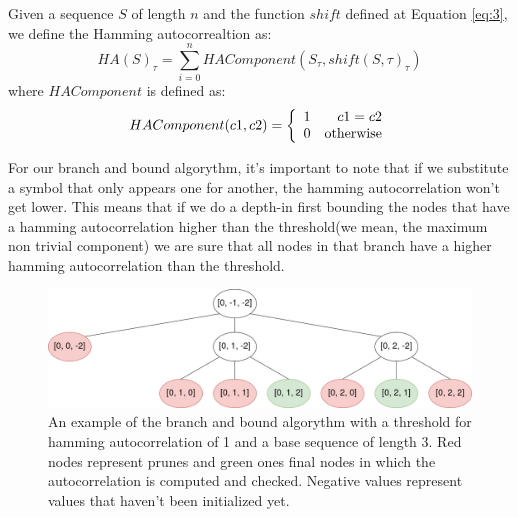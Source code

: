   \begin{definition}
    Given a sequence $S$ of length $n$ and the function $shift$ defined at
    Equation \ref{eq:3}, we define the Hamming autocorrealtion as:
      \begin{equation}
        HA(S)_{\tau} = \sum_{i=0}^{n} HAComponent(S_{\tau}, shift(S, \tau)_{\tau})
      \end{equation}
    where $HAComponent$ is defined as:
      \begin{equation}
        HAComponent(c1, c2) = \left\{\begin{array}{lr}
            1  &  c1 = c2\\
            0  & \textnormal{otherwise} \\
        \end{array}\right.
      \end{equation}
  \end{definition}

  For our branch and bound algorythm, it's important to note that if we
  substitute a symbol that only appears one for another, the hamming
  autocorrelation won't get lower. This means that if we do a depth-in first
  bounding the nodes that have a hamming autocorrelation higher than the
  threshold(we mean, the maximum non trivial component) we are sure that all
  nodes in that branch have a higher hamming autocorrelation than the
  threshold.\\

  \begin{figure}[ht!]
    \begin{center}
      \includegraphics[scale=0.4]{Chapters/Implementation/Example_branch_bound.png}
    \end{center}
    \caption{An example of the branch and bound algorythm with a threshold for
    hamming autocorrelation of 1 and a base sequence of length 3. Red nodes
    represent prunes and green ones final nodes in which the
    autocorrelation is computed and checked. Negative values represent values
    that haven't been initialized yet.}
    \label{bb:fig:1}
  \end{figure}

